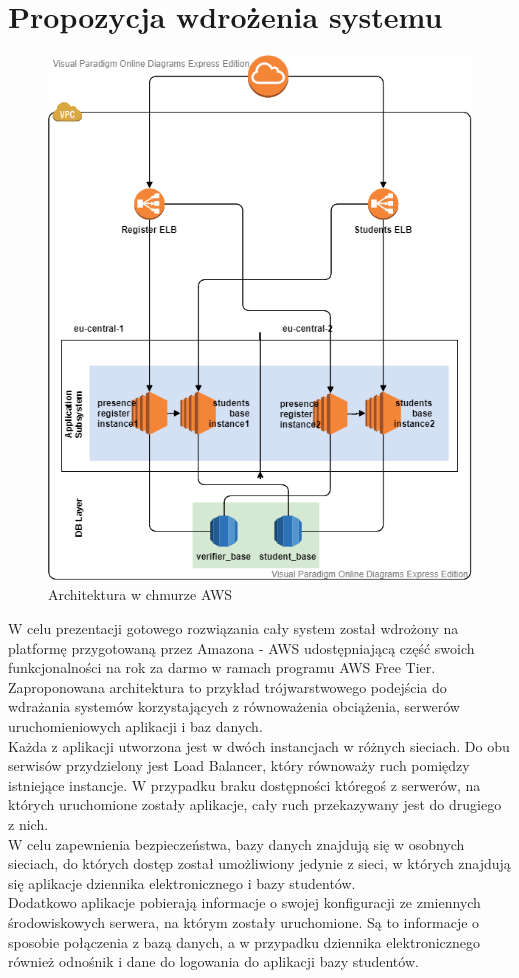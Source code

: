 \documentclass[declaration,shortabstract, mgr]{iithesis}
\begin{document}
\section{Propozycja wdrożenia systemu}
\begin{figure}[h]
\caption{Architektura w chmurze AWS}
\centering
\includegraphics[scale=0.6]{AWS.png}
\end{figure}
\indent W celu prezentacji gotowego rozwiązania cały system został wdrożony na platformę przygotowaną przez Amazona - AWS\cite{aws} udostępniającą część swoich funkcjonalności na rok za darmo w ramach programu AWS Free Tier. \\
\indent Zaproponowana architektura to przykład trójwarstwowego podejścia do wdrażania systemów korzystających z równoważenia obciążenia, serwerów uruchomieniowych aplikacji i baz danych. \\
\indent Każda z aplikacji utworzona jest w dwóch instancjach w różnych sieciach. Do obu serwisów przydzielony jest Load Balancer, który równoważy ruch pomiędzy istniejące instancje. W przypadku braku dostępności któregoś z serwerów, na których uruchomione zostały aplikacje, cały ruch przekazywany jest do drugiego z nich.\\
\indent W celu zapewnienia bezpieczeństwa, bazy danych znajdują się w osobnych sieciach, do których dostęp został umożliwiony jedynie z sieci, w których znajdują się aplikacje dziennika elektronicznego i bazy studentów. \\
\indent Dodatkowo aplikacje pobierają informacje o swojej konfiguracji ze zmiennych środowiskowych serwera, na którym zostały uruchomione. Są to informacje o sposobie połączenia z bazą danych, a w przypadku dziennika elektronicznego również odnośnik i dane do logowania do aplikacji bazy studentów.
\end{document}
